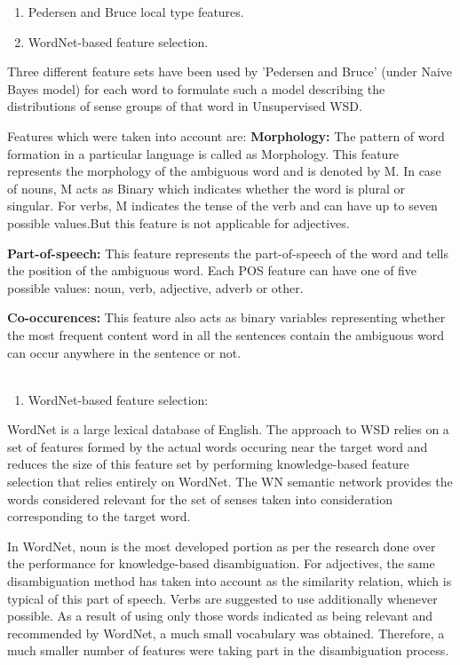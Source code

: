 \begin{enumerate}
	\item Pedersen and Bruce local type features.
	\item WordNet-based feature selection.
\end{enumerate}

Three different feature sets have been used by 'Pedersen and Bruce' (under Naive Bayes model) for each word to formulate such a model describing the distributions of sense groups of that word in Unsupervised WSD.

Features which were taken into account are:
\textbf{Morphology:} The pattern of word formation in a particular language is called as Morphology. 
This feature represents the morphology \cite{5494927} of the ambiguous word and is denoted by M. 
In case of nouns, M acts as Binary which indicates whether the word is plural or singular. 
For verbs, M indicates the tense of the verb and can have up to seven possible values.But this feature is not applicable for adjectives.

\textbf{Part-of-speech:} This feature represents the part-of-speech \cite{6982457} of the word and tells the position of the ambiguous word. Each POS feature can have one of five possible values: noun, verb, adjective, adverb or other.

\textbf{Co-occurences:} This feature also acts as binary variables representing whether the most frequent content word in all the sentences contain the ambiguous word can occur anywhere in the sentence or not.\\\\

\begin{enumerate}
	\item WordNet-based feature selection:
\end{enumerate}

WordNet is a large lexical database of English. The approach to WSD relies on a set of features formed by the actual words occuring near the target word and reduces the size of this feature set by performing knowledge-based feature selection that relies entirely on WordNet.
The WN semantic network provides the words considered relevant for the set of senses taken into consideration corresponding to the target word.

In WordNet, noun is the most developed portion as per the research done over the performance for knowledge-based disambiguation.
For adjectives, the same disambiguation method has taken into account as the similarity relation, which  is typical of this part of speech.
Verbs are suggested to use additionally whenever possible. 
As a result of using only those words indicated as being relevant and recommended by WordNet, a much small vocabulary was obtained. Therefore, a much smaller number of features were taking part in the disambiguation process.

